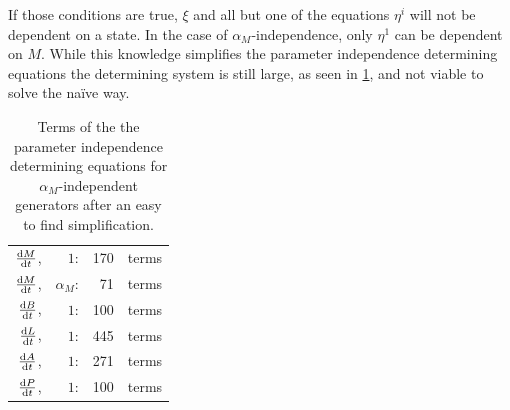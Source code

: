 If those conditions are true, \(\xi\) and all but one of the equations \(\eta^i\) will not be dependent on a state.
In the case of \(\alpha_M\)-independence, only \(\eta^1\) can be dependent on \(M\).
While this knowledge simplifies the parameter independence determining equations the determining system is still large, as seen in \cref{tab:lac-operon-parameter-independence-terms-simplified}, and not viable to solve the naïve way.
\begin{table}
  \centering
  \begin{tabular}{r@{ }rr@{ }l}
    \(\diff{M}{t}\),& \(1\):& 170& terms \\
    \(\diff{M}{t}\),& \(\alpha_M\):& 71& terms \\
    \(\diff{B}{t}\),& \(1\):& 100& terms \\
    \(\diff{L}{t}\),& \(1\):& 445& terms \\
    \(\diff{A}{t}\),& \(1\):& 271& terms \\
    \(\diff{P}{t}\),& \(1\):& 100& terms
  \end{tabular}
  \caption{Terms of the the parameter independence determining equations for \(\alpha_M\)-independent generators after an easy to find simplification.}
  \label{tab:lac-operon-parameter-independence-terms-simplified}
\end{table}
